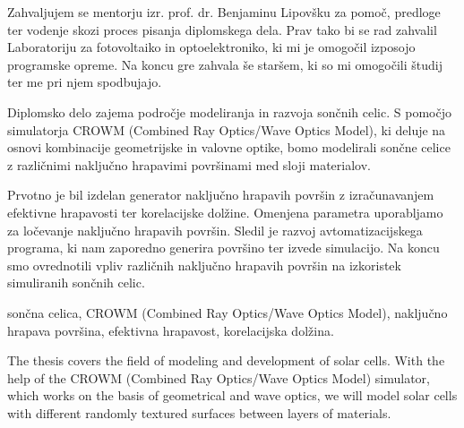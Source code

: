\documentclass[a4paper,twoside,openright,12pt,slovene]{book}
\date{Ljubljana, \the\year}
\begin{document}
\frontmatter






\maketitle

\zahvala
Zahvaljujem se mentorju izr. prof. dr. Benjaminu Lipovšku za pomoč, predloge ter vodenje skozi proces pisanja diplomskega dela. Prav tako bi se rad zahvalil Laboratoriju za fotovoltaiko in optoelektroniko, ki mi je omogočil izposojo programske opreme. Na koncu gre zahvala še staršem, ki so mi omogočili študij ter me pri njem spodbujajo. 


\povzetek

Diplomsko delo zajema področje modeliranja in razvoja sončnih celic. S pomočjo simulatorja CROWM (Combined Ray Optics/Wave Optics Model), ki deluje na osnovi kombinacije geometrijske in valovne optike, bomo modelirali sončne celice z različnimi naključno hrapavimi površinami med sloji materialov.

Prvotno je bil izdelan generator naključno hrapavih površin z izračunavanjem efektivne hrapavosti ter korelacijske dolžine. Omenjena parametra uporabljamo za ločevanje naključno hrapavih površin. Sledil je razvoj avtomatizacijskega programa, ki nam zaporedno generira površino ter izvede simulacijo.
Na koncu smo ovrednotili vpliv različnih naključno hrapavih površin na izkoristek simuliranih sončnih celic.


\kljucnebesede
sončna celica, CROWM (Combined Ray Optics/Wave Optics Model), naključno hrapava površina, efektivna hrapavost, korelacijska dolžina.



\abstract
The thesis covers the field of modeling and development of solar cells. With the help of the CROWM (Combined Ray Optics/Wave Optics Model) simulator, which works on the basis of geometrical and wave optics, we will model solar cells with different randomly textured surfaces between layers of materials.
\end{document}
